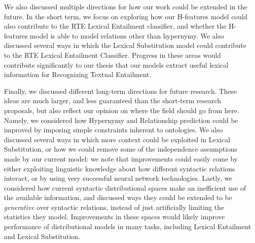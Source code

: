 \documentclass[12pt]{article}
\begin{document}
We also discussed multiple directions for how our work could be extended
in the future. In the short term, we focus on exploring how our H-features
model could also contribute to the RTE Lexical Entailment classifier, and
whether the H-features model is able to model relations other than hypernymy.
We also discussed several ways in which the Lexical Substitution model could
contribute to the RTE Lexical Entailment Classifier. Progress in these areas
would contribute significantly to our thesis that our models extract useful
lexical information for Recognizing Textual Entailment.

Finally, we discussed different long-term directions for future research. These
ideas are much larger, and less guaranteed than the short-term research
proposals, but also reflect our opinion on where the field should go from here.
Namely, we considered how Hypernymy and Relationship prediction could be
improved by imposing simple constraints inherent to ontologies. We also
discussed several ways in which more context could be exploited in Lexical
Substitution, or how we could remove some of the independence assumptions made
by our current model: we note that improvements could easily come by either
exploiting linguistic knowledge about how different syntactic relations
interact, or by using very successful neural network technologies. Lastly, we
considered how current syntactic distributional spaces make an inefficient use
of the available information, and discussed ways they could be extended to be
{\em generative} over syntactic relations, instead of just artificially
limiting the statistics they model. Improvements in these spaces would likely
improve performance of distributional models in many tasks, including
Lexical Entailment and Lexical Substitution.

\pagebreak


\end{document}
